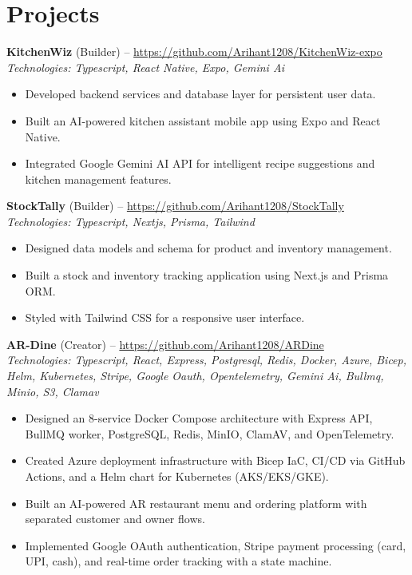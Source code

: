 \documentclass[11pt,a4paper]{article}
\begin{document}
\section{Projects}
\textbf{KitchenWiz} (Builder) -- \href{https://github.com/Arihant1208/KitchenWiz-expo}{https://github.com/Arihant1208/KitchenWiz-expo}
\\ \textit{Technologies: Typescript, React Native, Expo, Gemini Ai}
\begin{itemize}
  \item Developed backend services and database layer for persistent user data.
  \item Built an AI-powered kitchen assistant mobile app using Expo and React Native.
  \item Integrated Google Gemini AI API for intelligent recipe suggestions and kitchen management features.
\end{itemize}
\vspace{2pt}
\textbf{StockTally} (Builder) -- \href{https://github.com/Arihant1208/StockTally}{https://github.com/Arihant1208/StockTally}
\\ \textit{Technologies: Typescript, Nextjs, Prisma, Tailwind}
\begin{itemize}
  \item Designed data models and schema for product and inventory management.
  \item Built a stock and inventory tracking application using Next.js and Prisma ORM.
  \item Styled with Tailwind CSS for a responsive user interface.
\end{itemize}
\vspace{2pt}
\textbf{AR-Dine} (Creator) -- \href{https://github.com/Arihant1208/ARDine}{https://github.com/Arihant1208/ARDine}
\\ \textit{Technologies: Typescript, React, Express, Postgresql, Redis, Docker, Azure, Bicep, Helm, Kubernetes, Stripe, Google Oauth, Opentelemetry, Gemini Ai, Bullmq, Minio, S3, Clamav}
\begin{itemize}
  \item Designed an 8-service Docker Compose architecture with Express API, BullMQ worker, PostgreSQL, Redis, MinIO, ClamAV, and OpenTelemetry.
  \item Created Azure deployment infrastructure with Bicep IaC, CI/CD via GitHub Actions, and a Helm chart for Kubernetes (AKS/EKS/GKE).
  \item Built an AI-powered AR restaurant menu and ordering platform with separated customer and owner flows.
  \item Implemented Google OAuth authentication, Stripe payment processing (card, UPI, cash), and real-time order tracking with a state machine.
\end{itemize}
\vspace{2pt}
\end{document}
